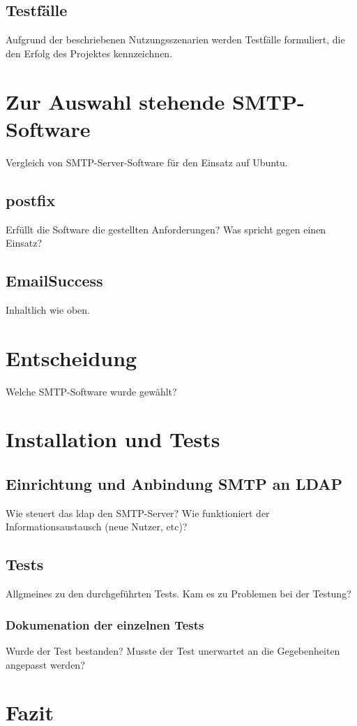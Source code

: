 \section{Testfälle}
Aufgrund der beschriebenen Nutzungsszenarien werden Testfälle formuliert, die den Erfolg des Projektes kennzeichnen. 

\chapter{Zur Auswahl stehende SMTP-Software}
Vergleich von SMTP-Server-Software für den Einsatz auf Ubuntu. 
\section{postfix}
Erfüllt die Software die gestellten Anforderungen? Was spricht gegen einen Einsatz?
\section{EmailSuccess}
Inhaltlich wie oben.

\chapter{Entscheidung}
Welche SMTP-Software wurde gewählt? 

\chapter{Installation und Tests}

\section{Einrichtung und Anbindung SMTP an LDAP}
Wie steuert das \ac{ldap} den SMTP-Server? Wie funktioniert der Informationsaustausch (neue Nutzer, etc)?

\section{Tests}
Allgmeines zu den durchgeführten Tests. Kam es zu Problemen bei der Testung?
\subsection{Dokumenation der einzelnen Tests}
Wurde der Test bestanden? Musste der Test unerwartet an die Gegebenheiten angepasst werden?

\chapter{Fazit}

\blindtext
